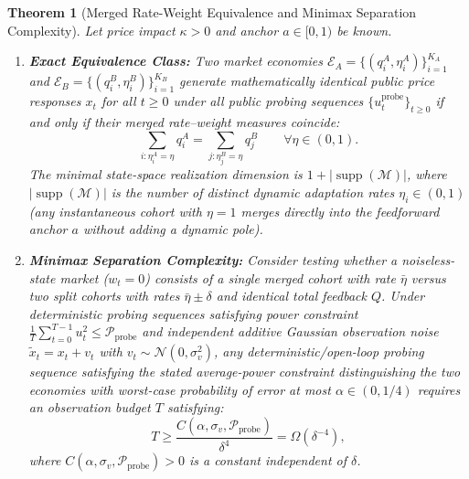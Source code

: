 \documentclass[12pt]{article}
\newtheorem{theorem}{Theorem}[section]
\theoremstyle{definition}
\theoremstyle{remark}
\begin{document}
\begin{theorem}[Merged Rate-Weight Equivalence and Minimax Separation Complexity]
\label{thm:m1_equivalence}\label{thm:m2_sample_complexity}
Let price impact $\kappa > 0$ and anchor $a \in [0, 1)$ be known.
\begin{enumerate}
    \item \textbf{Exact Equivalence Class:} Two market economies $\mathcal{E}_A = \{(q_i^A, \eta_i^A)\}_{i=1}^{K_A}$ and $\mathcal{E}_B = \{(q_i^B, \eta_i^B)\}_{i=1}^{K_B}$ generate mathematically identical public price responses $x_t$ for all $t \ge 0$ under all public probing sequences $\{u_t^{\text{probe}}\}_{t \ge 0}$ if and only if their merged rate--weight measures coincide:
    \begin{equation}
    \sum_{i: \eta_i^A = \eta} q_i^A = \sum_{j: \eta_j^B = \eta} q_j^B \qquad \forall \eta \in (0, 1).
    \label{eq:merged_measure}
    \end{equation}
    The minimal state-space realization dimension is $1 + |\operatorname{supp}(\mathcal{M})|$, where $|\operatorname{supp}(\mathcal{M})|$ is the number of distinct dynamic adaptation rates $\eta_i \in (0, 1)$ (any instantaneous cohort with $\eta = 1$ merges directly into the feedforward anchor $a$ without adding a dynamic pole).
    \item \textbf{Minimax Separation Complexity:} Consider testing whether a noiseless-state market ($w_t = 0$) consists of a single merged cohort with rate $\bar{\eta}$ versus two split cohorts with rates $\bar{\eta} \pm \delta$ and identical total feedback $Q$. Under deterministic probing sequences satisfying power constraint $\frac{1}{T} \sum_{t=0}^{T-1} u_t^2 \le \mathcal{P}_{\text{probe}}$ and independent additive Gaussian observation noise $\tilde{x}_t = x_t + v_t$ with $v_t \sim \mathcal{N}(0, \sigma_v^2)$, any deterministic/open-loop probing sequence satisfying the stated average-power constraint distinguishing the two economies with worst-case probability of error at most $\alpha \in (0, 1/4)$ requires an observation budget $T$ satisfying:
    \begin{equation}
    T \ge \frac{C(\alpha, \sigma_v, \mathcal{P}_{\text{probe}})}{\delta^4} = \Omega(\delta^{-4}),
    \label{eq:delta_fourth}
    \end{equation}
    where $C(\alpha, \sigma_v, \mathcal{P}_{\text{probe}}) > 0$ is a constant independent of $\delta$.
\end{enumerate}
\end{theorem}
\end{document}
